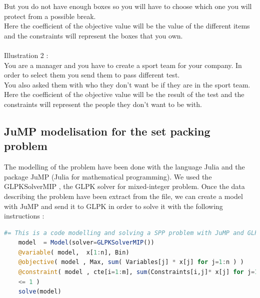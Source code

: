 \documentclass[12pt]{article}
\begin{document}
	But you do not have enough boxes so you will have to choose which one you will protect from a possible break.\\
	Here the coefficient of the objective value will be the value of the different items and the constraints will represent the boxes that you own.\\
	\vspace{5pt} \\
	Illustration 2 :\\
	You are a manager and you have to create a sport team for your company. In order to select them you send them to pass different test.\\ You also asked them with who they don't want be if they are in the sport team.\\
	Here the coefficient of the objective value will be the result of the test and the constraints will represent the people they don't want to be with.\\
	
	\subsection{JuMP modelisation for the set packing problem}
	 The modelling of the problem have been done with the language Julia and the package
	JuMP (Julia for mathematical programming). We used the GLPKSolverMIP , the GLPK
	solver for mixed-integer problem. Once the data describing the problem have been
	extract from the file, we can create a model with JuMP and send it to GLPK in order to solve it with the
	following instructions :\\
	\begin{lstlisting}[language=julia,caption={Configuration du demon SNMP}]
	#= This is a code modelling and solving a SPP problem with JuMP and GLPK) =#
	model  = Model(solver=GLPKSolverMIP())
	@variable( model,  x[1:n], Bin)
	@objective( model , Max, sum( Variables[j] * x[j] for j=1:n ) )
	@constraint( model , cte[i=1:m], sum(Constraints[i,j]* x[j] for j=1:n) 
	<= 1 )
	solve(model)
	\end{lstlisting}
\end{document}
